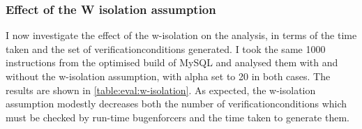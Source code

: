 \subsubsection{Effect of the W isolation assumption}
\label{sect:eval:w_isolation}


I now investigate the effect of the \gls{w-isolation} on the analysis,
in terms of the time taken and the set of
\glspl{verificationcondition} generated.  I took the same 1000
instructions from the optimised build of MySQL and analysed them with
and without the \gls{w-isolation} assumption, with \gls{alpha} set to
20 in both cases.  The results are shown in
\autoref{table:eval:w-isolation}.  As expected, the \gls{w-isolation}
assumption modestly decreases both the number of
\glspl{verificationcondition} which must be checked by run-time
\glspl{bugenforcer} and the time taken to generate them.

